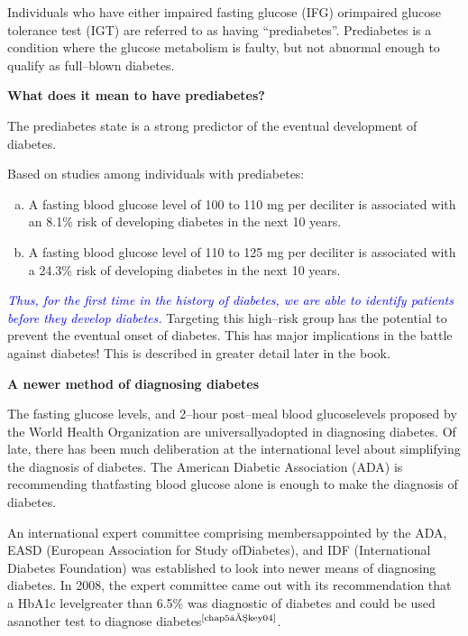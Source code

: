 Individuals who have either impaired fasting glucose (IFG) or\break impaired glucose tolerance test (IGT) are referred to as having “prediabetes”. Prediabetes is a condition where the glucose metabolism is faulty, but not abnormal enough to qualify as full–blown diabetes.

\noindent
\textbf{What does it mean to have prediabetes?}

The prediabetes state is a strong predictor of the eventual deve\-lopment of diabetes.

Based on studies among individuals with prediabetes:

\begin{enumerate}[a)]
\itemsep=0pt
\item A fasting blood glucose level of 100 to 110 mg per deciliter is asso\-ciated with an 8.1\% risk of developing diabetes in the next 10 years.
 \item A fasting blood glucose level of 110 to 125 mg per deciliter is associated with a 24.3\% risk of developing diabetes in the next 10 years.
 \end{enumerate}

\textcolor{blue}{\textit{Thus, for the first time in the history of diabetes, we are able to identify patients before they develop diabetes.}} Targeting this high–risk group has the potential to prevent the eventual onset of diabetes. This has major implications in the battle against diabetes! This is described in greater detail later in the book.

\noindent
\textbf{A newer method of diagnosing diabetes}

The fasting glucose levels, and 2–hour post–meal blood glu\-cose\break levels proposed by the World Health Organization are universally\break ado\-pted in diagnosing diabetes. Of late, there has been much delibe\-ration at the international level about simplifying the diagnosis of diabetes. The American Diabetic Association (ADA) is recommending that\break fasting blood glucose alone is enough to make the diagnosis of diabetes.


An international expert committee comprising members\break appoin\-ted by the ADA, EASD (European Association for Study of\break Diabetes), and IDF (International Diabetes Foundation) was established to look into newer means of diagnosing diabetes. In 2008, the expert commi\-ttee came out with its recommendation that a HbA1c level\break greater than 6.5\% was diagnostic of diabetes and could be used as\break another test to diagnose diabetes$^{\text{\cite{chap5–key04}}}$.

